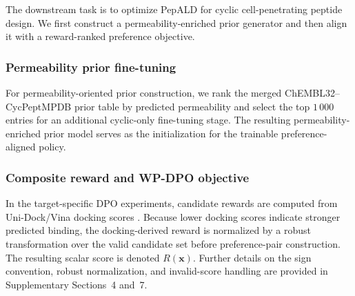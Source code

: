 \begin{methods}
The downstream task is to optimize PepALD for cyclic cell-penetrating peptide design.
We first construct a permeability-enriched prior generator and then align it with a reward-ranked preference objective.

\subsubsection{Permeability prior fine-tuning}\label{subsubsec:permeability_prior}

For permeability-oriented prior construction, we rank the merged ChEMBL32--CycPeptMPDB prior table by predicted permeability and select the top $1\,000$ entries for an additional cyclic-only fine-tuning stage.
The resulting permeability-enriched prior model serves as the initialization for the trainable preference-aligned policy.

\subsubsection{Composite reward and WP-DPO objective}\label{subsubsec:dpo_loss}

In the target-specific DPO experiments, candidate rewards are computed from Uni-Dock/Vina docking scores \citep{ref_unidock}.
Because lower docking scores indicate stronger predicted binding, the docking-derived reward is normalized by a robust transformation over the valid candidate set before preference-pair construction.
The resulting scalar score is denoted $R(\mathbf{x})$.
Further details on the sign convention, robust normalization, and invalid-score handling are provided in Supplementary Sections~4 and~7.


\end{methods}
